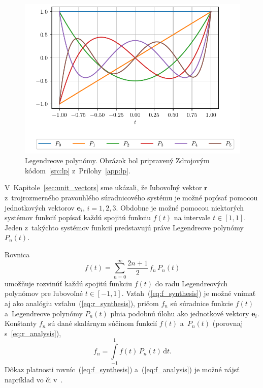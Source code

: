 \documentclass[a4paper,12pt]{book}
\newcommand{\diff}{\mathrm d}
\let\vec\mathbf
\begin{document}
\begin{figure}[bt]
\centering
\includegraphics{./fig-legendre-polynomials.pdf}
\caption{Legendreove polynómy.  Obrázok bol pripravený Zdrojovým
kódom~\ref{src:lp} z~Prílohy~\ref{app:lp}.}
\label{fig:lp}
\end{figure}

V~Kapitole~\ref{sec:unit_vectors} sme ukázali, že ľubovoľný vektor $\vec r$
z~trojrozmerného pravouhlého súradnicového systému je možné popísať pomocou
jednotkových vektorov $\vec e_i$, $i = 1, 2, 3$.  Obdobne je možné pomocou
niektorých systémov funkcií popísať každú spojitú funkciu $f(t)$ na intervale
$t \in [1, 1]$.  Jeden z~takýchto systémov funkcií predstavujú práve
Legendreove polynómy~$P_n(t)$.

Rovnica
%
\begin{equation}
\label{eq:f_synthesis}
f(t) = \sum_{n = 0}^\infty \frac{2n + 1}{2} \, f_n \, P_n(t)
\end{equation}
%
umožňuje rozvinúť každú spojitú funkciu $f(t)$ do radu Legendreových polynómov
pre ľubovoľné $t \in [-1, 1]$.  Vzťah~(\ref{eq:f_synthesis}) je možné vnímať aj
ako analógiu vzťahu~(\ref{eq:r_synthesis}), pričom $f_n$ sú súradnice funkcie
$f(t)$ a~Legendreove polynómy $P_n(t)$ plnia podobnú úlohu ako jednotkové
vektory $\vec e_i$.  Konštanty $f_n$ sú dané skalárnym súčinom funkcií $f(t)$
a~$P_n(t)$ (porovnaj s~\ref{eq:r_analysis}),
%
\begin{equation}
\label{eq:f_analysis}
f_n = \int\limits_{-1}^1 f(t) \, P_n(t) \, \diff t{.}
\end{equation}
%
Dôkaz platnosti rovníc~(\ref{eq:f_synthesis}) a~(\ref{eq:f_analysis}) je možné 
nájsť napríklad vo \textcite{Freeden2009} či 
v~\textcite{SansoGeoidDetermination}.
\end{document}
